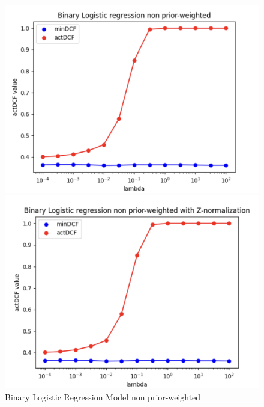 \documentclass{article}
\begin{document}
\begin{figure}[H]
\begin{minipage}{.27\textwidth}
        \includegraphics[width=\linewidth]{./img/LLR_noW3.png}
    \end{minipage}%
    \begin{minipage}{.25\textwidth}
        \centering
        \includegraphics[width=\linewidth]{./img/LLR_Z1.png} %
    \end{minipage}
    \caption{Binary Logistic Regression Model non prior-weighted}
    \label{fig:LLR_model}
\end{figure}
\end{document}
